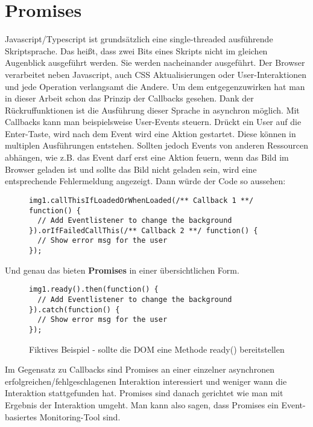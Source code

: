 \section{Promises}

Javascript/Typescript ist grundsätzlich eine single-threaded ausführende Skriptsprache. Das heißt, dass zwei Bits eines Skripts nicht im gleichen Augenblick ausgeführt werden. Sie werden nacheinander ausgeführt. Der Browser verarbeitet neben Javascript, auch CSS Aktualisierungen oder User-Interaktionen und jede Operation verlangsamt die Andere. Um dem entgegenzuwirken hat man in dieser Arbeit schon das Prinzip der Callbacks gesehen. Dank der Rückruffunktionen ist die Ausführung dieser Sprache in asynchron möglich. Mit Callbacks kann man beispielsweise User-Events steuern. Drückt ein User auf die Enter-Taste, wird nach dem Event wird eine Aktion gestartet. Diese können in multiplen Ausführungen entstehen. Sollten jedoch Events von anderen Ressourcen abhängen, wie z.B. das Event darf erst eine Aktion \glqq{}feuern\grqq{}, wenn das Bild im Browser geladen ist und sollte das Bild nicht geladen sein, wird eine entsprechende Fehlermeldung angezeigt. Dann würde der Code so aussehen:

\begin{figure}[H]
\begin{lstlisting}
img1.callThisIfLoadedOrWhenLoaded(/** Callback 1 **/ function() {
  // Add Eventlistener to change the background
}).orIfFailedCallThis(/** Callback 2 **/ function() {
  // Show error msg for the user
});
\end{lstlisting}
\end{figure}

\noindent
Und genau das bieten \textbf{Promises} in einer übersichtlichen Form.

\begin{figure}[H]
\begin{lstlisting}
img1.ready().then(function() {
  // Add Eventlistener to change the background
}).catch(function() {
  // Show error msg for the user
});
\end{lstlisting}
\caption{Fiktives Beispiel - sollte die DOM eine Methode ready() bereitstellen \cite{callback-vs-promises}}
\end{figure}

\noindent
Im Gegensatz zu Callbacks sind Promises an einer einzelner asynchronen erfolgreichen/fehlgeschlagenen Interaktion interessiert und weniger wann die Interaktion stattgefunden hat. Promises sind danach gerichtet wie man mit Ergebnis der Interaktion umgeht. Man kann also sagen, dass Promises ein Event-basiertes Monitoring-Tool sind.

